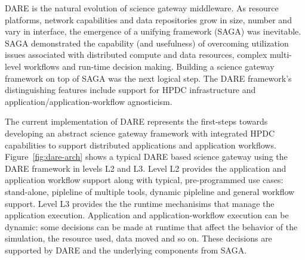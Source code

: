 \documentclass[]{svjour3}
\begin{document}

DARE is the natural evolution of science gateway middleware. As
resource platforms, network capabilities and data repositories grow in
size, number and vary in interface, the emergence of a unifying
framework (SAGA) was inevitable.  SAGA demonstrated the capability
(and usefulness) of overcoming utilization issues associated with
distributed compute and data resources, complex multi-level workflows
and run-time decision making. Building a science gateway framework on
top of SAGA was the next logical step. The DARE framework's
distinguishing features include support for HPDC infrastructure and
application/application-workflow agnosticism.  



The current implementation of DARE represents the first-steps towards developing
an abstract science gateway framework with integrated HPDC capabilities to support
distributed applications and application workflows. Figure~\ref{fig:dare-arch}
shows a typical DARE based science gateway using the DARE framework in
levels L2 and L3. Level L2 provides the application and application workflow
support along with typical, pre-programmed use cases: stand-alone, pipleline of
multiple tools, dynamic pipleline and general workflow support. Level L3 provides
the the runtime mechanisims that manage the application execution. Application
and application-workflow execution can be dynamic: some decisions can be made
at runtime that affect the behavior of the simulation, the resource used,
data moved and so on. These decisions are supported by DARE and the
underlying components from SAGA.
\end{document}
